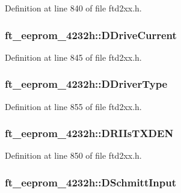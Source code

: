 Definition at line 840 of file ftd2xx.h.\hypertarget{structft__eeprom__4232h_a36cb4f439c051c485013966f16adc5ab}{
\subsubsection[{DDriveCurrent}]{ {\bf ft\_\-eeprom\_\-4232h::DDriveCurrent}}}
\label{structft__eeprom__4232h_a36cb4f439c051c485013966f16adc5ab}


Definition at line 845 of file ftd2xx.h.\hypertarget{structft__eeprom__4232h_a686ad080f8c280b2ca149233f584fb29}{
\subsubsection[{DDriverType}]{ {\bf ft\_\-eeprom\_\-4232h::DDriverType}}}
\label{structft__eeprom__4232h_a686ad080f8c280b2ca149233f584fb29}


Definition at line 855 of file ftd2xx.h.\hypertarget{structft__eeprom__4232h_aff58f44eb2769cd3d614cdd03357a56c}{
\subsubsection[{DRIIsTXDEN}]{ {\bf ft\_\-eeprom\_\-4232h::DRIIsTXDEN}}}
\label{structft__eeprom__4232h_aff58f44eb2769cd3d614cdd03357a56c}


Definition at line 850 of file ftd2xx.h.\hypertarget{structft__eeprom__4232h_aba9def054b418e85177c70cae98cb17e}{
\subsubsection[{DSchmittInput}]{ {\bf ft\_\-eeprom\_\-4232h::DSchmittInput}}}
\label{structft__eeprom__4232h_aba9def054b418e85177c70cae98cb17e}


